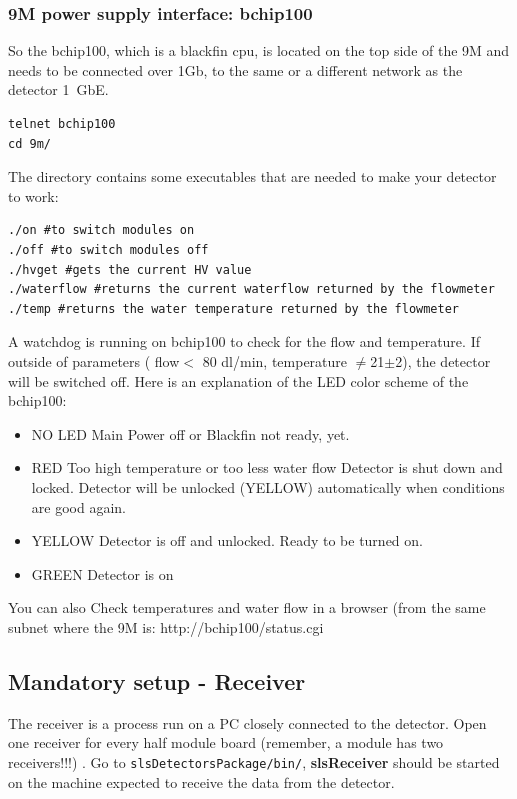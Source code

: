 \documentclass{article}
\begin{document}
\subsubsection{9M power supply interface: bchip100}\label{bchip100}
So the bchip100, which is a blackfin cpu, is located on the top side of the 9M and needs to be connected over 1Gb, to the same or a different network as the detector 1~GbE. 
 \begin{verbatim}
telnet bchip100
cd 9m/
\end{verbatim}
The directory contains some executables that are needed to make your detector to work:
 \begin{verbatim}
./on #to switch modules on
./off #to switch modules off
./hvget #gets the current HV value
./waterflow #returns the current waterflow returned by the flowmeter
./temp #returns the water temperature returned by the flowmeter
 \end{verbatim}
A watchdog is running on bchip100 to check for the flow and temperature. If outside of parameters ( flow$<$ 80 dl/min, temperature $\neq$21$\pm$2), the detector will be switched off. 
Here is an explanation of the LED color scheme of the bchip100: 
\begin{itemize}
\item NO LED  Main Power off or Blackfin not ready, yet.
\item RED     Too high temperature or too less water flow
        Detector is shut down and locked.
        Detector will be unlocked (YELLOW) automatically when conditions are good again.
\item YELLOW  Detector is off and unlocked. Ready to be turned on.
\item GREEN   Detector is on
\end{itemize}
You can also Check temperatures and water flow in a browser (from the same subnet where the 9M is: http://bchip100/status.cgi



  
\subsection{Mandatory setup - Receiver}

The receiver is a process run on a PC closely connected to the detector. Open one receiver for every half module board (remember, a module has two receivers!!!) . Go to {\tt{slsDetectorsPackage/bin/}}, \textbf{slsReceiver} should be started on the machine expected to receive the data from the detector.
\end{document}
